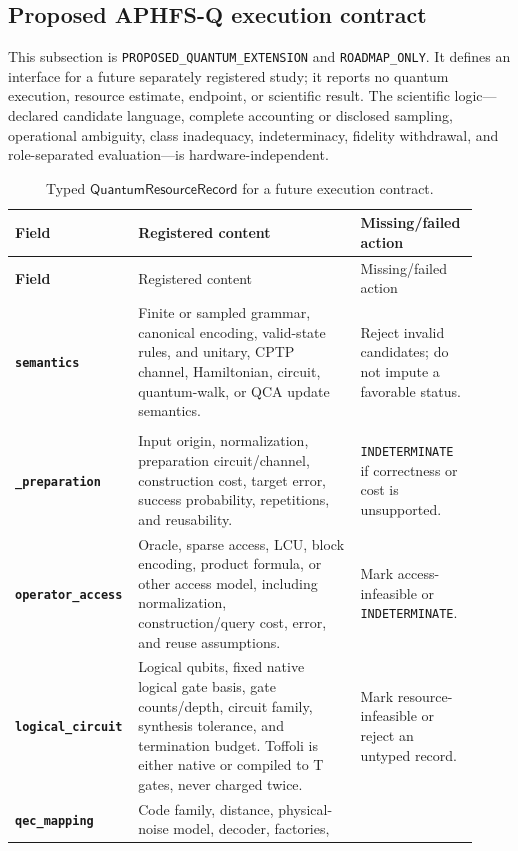 \subsection{Proposed APHFS-Q execution contract}
\label{supp:quantum-contract}

This subsection is \texttt{PROPOSED\_QUANTUM\_EXTENSION} and \texttt{ROADMAP\_ONLY}. It defines an
interface for a future separately registered study; it reports no quantum execution, resource
estimate, endpoint, or scientific result. The scientific logic---declared candidate language,
complete accounting or disclosed sampling, operational ambiguity, class inadequacy,
indeterminacy, fidelity withdrawal, and role-separated evaluation---is hardware-independent.

\begin{longtable}{>{\bfseries}p{0.20\linewidth}p{0.47\linewidth}p{0.25\linewidth}}
\caption{Typed \(\mathsf{QuantumResourceRecord}\) for a future execution contract.}\label{tab:q-contract-full}\\
\toprule
Field & Registered content & Missing/failed action \\
\midrule
\endfirsthead
\toprule
Field & Registered content & Missing/failed action \\
\midrule
\endhead
\texttt{semantics} & Finite or sampled grammar, canonical encoding, valid-state rules, and
unitary, CPTP channel, Hamiltonian, circuit, quantum-walk, or QCA update semantics. & Reject invalid
candidates; do not impute a favorable status.\\
\shortstack[l]{\texttt{input\_and}\\\texttt{\_preparation}} & Input origin, normalization, preparation circuit/channel,
construction cost, target error, success probability, repetitions, and reusability. &
\texttt{INDETERMINATE} if correctness or cost is unsupported.\\
\texttt{operator\_access} & Oracle, sparse access, LCU, block encoding, product formula, or other
access model, including normalization, construction/query cost, error, and reuse assumptions. &
Mark access-infeasible or \texttt{INDETERMINATE}.\\
\texttt{logical\_circuit} & Logical qubits, fixed native logical gate basis, gate counts/depth,
circuit family, synthesis tolerance, and termination budget. Toffoli is either native or compiled
to T gates, never charged twice. & Mark resource-infeasible or reject an untyped record.\\
\texttt{qec\_mapping} & Code family, distance, physical-noise model, decoder, factories,

\end{longtable}
